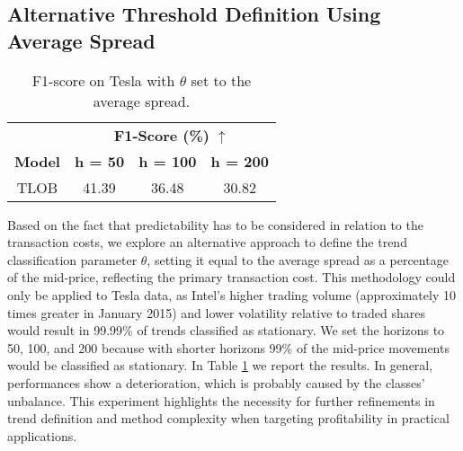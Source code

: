 \subsection{Alternative Threshold Definition Using Average Spread}
\begin{table}[h!]
\centering
\begin{minipage}{0.48\textwidth}
\centering
        \caption{F1-score on Tesla with $\theta$ set to the average spread.} 
        \label{tab:theta}
        \begin{tabular}{c|ccc}
            \toprule
            & \multicolumn{3}{c}{\textbf{F1-Score (\%) }$\uparrow$} \\
            \cmidrule(lr){2-4} 
            \textbf{Model} & \textbf{h = 50} & \textbf{h = 100} & \textbf{h = 200}  \\
            \midrule
            TLOB & 41.39 & 36.48 & 30.82 \\
            \bottomrule
        \end{tabular}
        \end{minipage}
\end{table}
\label{sec:theta}

Based on the fact that predictability has to be considered in relation to the transaction costs, we explore an alternative approach to define the trend classification parameter $\theta$, setting it equal to the average spread as a percentage of the mid-price, reflecting the primary transaction cost. 
This methodology could only be applied to Tesla data, as Intel's higher trading volume (approximately 10 times greater in January 2015) and lower volatility relative to traded shares would result in 99.99\% of trends classified as stationary.
We set the horizons to 50, 100, and 200 because with shorter horizons 99\% of the mid-price movements would be classified as stationary. 
In Table \ref{tab:theta} we report the results. 
In general, performances show a deterioration, which is probably caused by the classes' unbalance.
This experiment highlights the necessity for further refinements in trend definition and method complexity when targeting profitability in practical applications.


